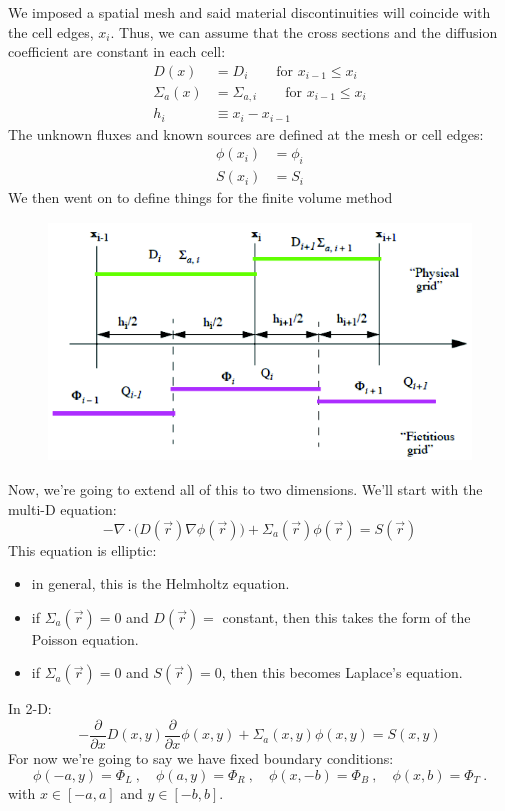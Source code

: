 \documentclass[12pt]{article}
\begin{document}
We imposed a spatial mesh and said material discontinuities will coincide with the cell edges, $x_i$. Thus, we can assume that the cross sections and the diffusion coefficient are constant in each cell:
%
\begin{align}
D(x) &= D_i \qquad \text{for } x_{i-1} \leq x_i \nonumber \\
\Sigma_{a}(x) &= \Sigma_{a,i} \qquad \text{for } x_{i-1} \leq x_i \nonumber \\
h_i &\equiv x_i - x_{i-1} \nonumber 
\end{align}
%
The unknown fluxes and known sources are defined at the mesh or cell edges:
\begin{align}
\phi(x_i) &= \phi_i \nonumber \\
S(x_i) &= S_i \nonumber 
\end{align}
%
We then went on to define things for the finite volume method
\begin{center}
\begin{figure}[h!]
\includegraphics[height=2.5in]{FVM-DE}
\end{figure}
\end{center}

Now, we're going to extend all of this to two dimensions. We'll start with the multi-D equation:
\[-\nabla \cdot \bigl(D(\vec{r})\nabla \phi(\vec{r})\bigr) + \Sigma_a(\vec{r}) \phi(\vec{r}) = S(\vec{r})\]
%
This equation is elliptic:
\begin{itemize}
\item in general, this is the Helmholtz equation.
\item if $\Sigma_a(\vec{r})=0$ and $D(\vec{r})=$ constant, then this takes the form of the Poisson equation.
\item if $\Sigma_a(\vec{r})=0$ and $S(\vec{r})=0$, then this becomes Laplace's equation. 
\end{itemize}

In 2-D:
\[-\frac{\partial}{\partial x}D(x,y)\frac{\partial}{\partial x} \phi(x,y) + \Sigma_a(x,y) \phi(x,y) = S(x,y)\]
%
For now we're going to say we have fixed boundary conditions:
\[\phi(-a,y) = \Phi_L\:, \quad \phi(a,y) = \Phi_R\:, \quad \phi(x,-b) = \Phi_B\:, \quad \phi(x,b) = \Phi_T\:.\]
with $x \in [-a,a]$ and $y \in [-b,b]$.
\end{document}

